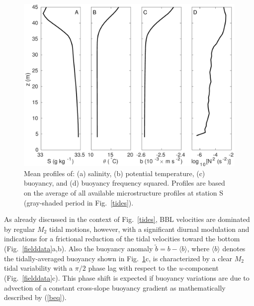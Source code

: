\begin{figure}[ht]
  \noindent\includegraphics[width=30pc]{res_daten.pdf}
  \caption{Mean profiles of: (a) salinity, (b) potential temperature,
    (c) buoyancy, and (d) buoyancy frequency squared. Profiles are based on the 
average of all available microstructure profiles at station S (gray-shaded 
period in Fig.\ \ref{tides}).}
  \label{meanprofiles}
\end{figure}

As already discussed in the context of Fig.\ \ref{tides}, BBL
velocities are dominated by regular $M_2$ tidal motions, however, with
a significant diurnal modulation and indications for a frictional
reduction of the tidal velocities toward the bottom
(Fig.\ \ref{fielddata}a,b). Also the buoyancy anomaly
$\tilde{b}=b-\langle b \rangle$, where $ \langle b \rangle$ denotes
the tidally-averaged buoyancy shown in Fig.\ \ref{meanprofiles}c, is
characterized by a clear $M_2$ tidal variability with a $\pi/2$ phase
lag with respect to the $u$-component (Fig.\ \ref{fielddata}c). This
phase shift is expected if buoyancy variations are due to advection of
a constant cross-slope buoyancy gradient as mathematically described
by (\ref{beq}).

